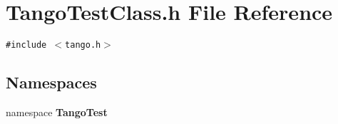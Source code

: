 \section{Tango\-Test\-Class.h File Reference}
\label{TangoTestClass_8h}
{\tt \#include $<$tango.h$>$}\par
\subsection*{Namespaces}
\begin{CompactItemize}
\item 
namespace {\bf Tango\-Test}
\end{CompactItemize}
